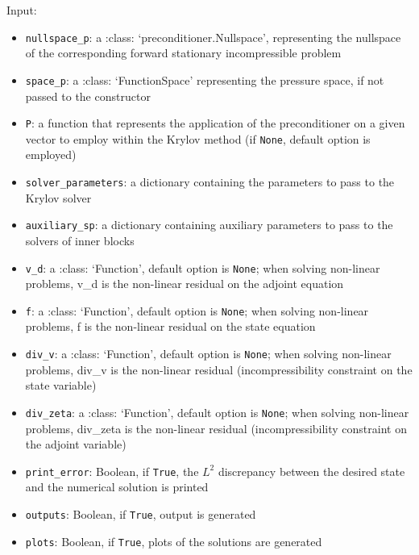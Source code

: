 \documentclass[letterpaper,10pt,english]{sphinxmanual}
\begin{document}
Input:
\begin{itemize}
\item \texttt{nullspace{\_}p}: a :class: `preconditioner.Nullspace', representing
            the nullspace of the corresponding forward stationary
            incompressible problem

\item \texttt{space{\_}p}: a :class: `FunctionSpace' representing the pressure
            space, if not passed to the constructor

\item \texttt{P}: a function that represents the application of the
            preconditioner on a given vector to employ within the Krylov
            method (if \texttt{None}, default option is employed)

\item \texttt{solver{\_}parameters}: a dictionary containing the parameters to pass
            to the Krylov solver

\item \texttt{auxiliary{\_}sp}: a dictionary containing auxiliary parameters to
            pass to the solvers of inner blocks

\item \texttt{v{\_}d}: a :class: `Function', default option is \texttt{None}; when solving
            non-linear problems, v\_d is the non-linear residual on the adjoint
            equation

\item \texttt{f}: a :class: `Function', default option is \texttt{None}; when solving
            non-linear problems, f is the non-linear residual on the state
            equation

\item \texttt{div{\_}v}: a :class: `Function', default option is \texttt{None}; when solving
            non-linear problems, div\_v is the non-linear residual
            (incompressibility constraint on the state variable)

\item \texttt{div{\_}zeta}:  a :class: `Function', default option is \texttt{None}; when
            solving non-linear problems, div\_zeta is the non-linear residual
            (incompressibility constraint on the adjoint variable)

\item \texttt{print{\_}error}: Boolean, if \texttt{True}, the $L^2$ discrepancy between the
            desired state and the numerical solution is printed

\item \texttt{outputs}: Boolean, if \texttt{True}, output is generated

\item \texttt{plots}: Boolean, if \texttt{True}, plots of the solutions are generated
\end{itemize}
\end{document}
